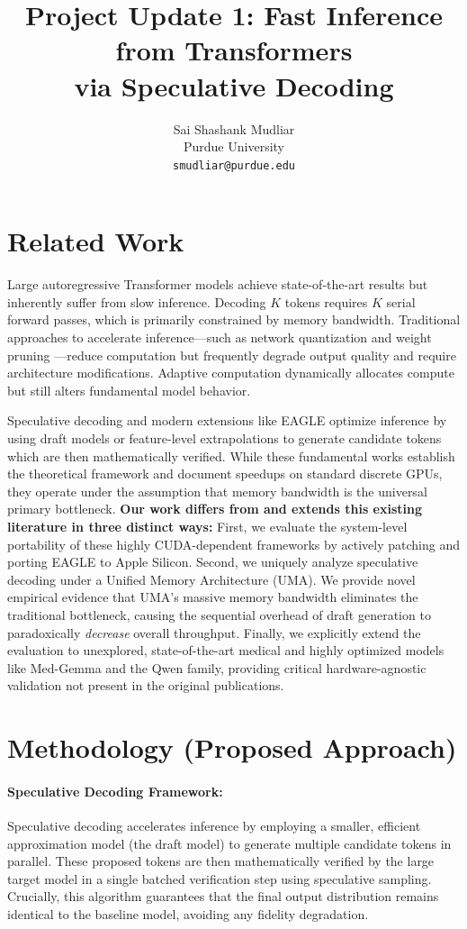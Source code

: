 \documentclass[11pt]{article}
\title{Project Update 1: Fast Inference from Transformers \\ via Speculative Decoding}
\author{Sai Shashank Mudliar \\
  Purdue University \\
  \texttt{smudliar@purdue.edu}
}
\begin{document}
\maketitle

\section{Related Work}
Large autoregressive Transformer models achieve state-of-the-art results but inherently suffer from slow inference. Decoding $K$ tokens requires $K$ serial forward passes, which is primarily constrained by memory bandwidth. Traditional approaches to accelerate inference---such as network quantization and weight pruning \cite{hubara2016quantized}---reduce computation but frequently degrade output quality and require architecture modifications. Adaptive computation \cite{schuster2021confident} dynamically allocates compute but still alters fundamental model behavior. 

Speculative decoding \cite{leviathan2022fast} and modern extensions like EAGLE optimize inference by using draft models or feature-level extrapolations to generate candidate tokens which are then mathematically verified. While these fundamental works establish the theoretical framework and document speedups on standard discrete GPUs, they operate under the assumption that memory bandwidth is the universal primary bottleneck. \textbf{Our work differs from and extends this existing literature in three distinct ways:} First, we evaluate the system-level portability of these highly CUDA-dependent frameworks by actively patching and porting EAGLE to Apple Silicon. Second, we uniquely analyze speculative decoding under a Unified Memory Architecture (UMA). We provide novel empirical evidence that UMA's massive memory bandwidth eliminates the traditional bottleneck, causing the sequential overhead of draft generation to paradoxically \textit{decrease} overall throughput. Finally, we explicitly extend the evaluation to unexplored, state-of-the-art medical and highly optimized models like Med-Gemma and the Qwen family, providing critical hardware-agnostic validation not present in the original publications.

\section{Methodology (Proposed Approach)}

\paragraph{Speculative Decoding Framework:}
Speculative decoding \cite{leviathan2022fast} accelerates inference by employing a smaller, efficient approximation model (the draft model) to generate multiple candidate tokens in parallel. These proposed tokens are then mathematically verified by the large target model in a single batched verification step using speculative sampling. Crucially, this algorithm guarantees that the final output distribution remains identical to the baseline model, avoiding any fidelity degradation. 
\end{document}
